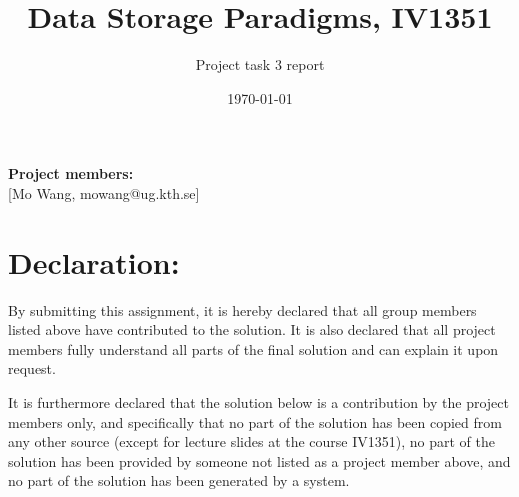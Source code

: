 \documentclass[a4paper]{scrartcl}
\title{Data Storage Paradigms, IV1351}
\subtitle{Project task 3 report}
\author{}
\date{\today}
\renewcommand{\_}{\textunderscore\allowbreak}
\begin{document}
\maketitle
\noindent\textbf{Project members:} \\ \hfill
[Mo Wang, mowang@ug.kth.se] \\ \hfill

\section*{Declaration:}

By submitting this assignment, it is hereby declared that all group members listed above have contributed to the solution. It is also declared that all project members fully understand all parts of the final solution and can explain it upon request.

It is furthermore declared that the solution below is a contribution by the project members only, and specifically that no part of the solution has been copied from any other source (except for lecture slides at the course IV1351), no part of the solution has been provided by someone not listed as a project member above, and no part of the solution has been generated by a system.




\end{document}
